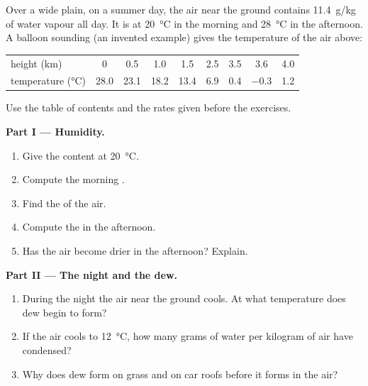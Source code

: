 \begin{problem}
\label{pb:g10:why-clouds-form:1}
Over a wide plain, on a summer day, the air near the ground contains
\qty{11.4}{g/kg} of water vapour all day. It is at \qty{20}{\degreeCelsius}
in the morning and \qty{28}{\degreeCelsius} in the afternoon. A balloon
sounding (an invented example) gives the temperature of the air above:

\begin{center}
\small
\begin{tabular}{l*{8}{c}}
\hline
height (km) & 0 & 0.5 & 1.0 & 1.5 & 2.5 & 3.5 & 3.6 & 4.0 \\
temperature (\unit{\degreeCelsius}) & 28.0 & 23.1 & 18.2 & 13.4 & 6.9 & 0.4 & $-0.3$ & 1.2 \\
\hline
\end{tabular}
\end{center}

\noindent Use the table of  contents and the rates given before
the exercises.

\medskip
\noindent\textbf{Part I --- Humidity.}
\begin{enumerate}
  \item Give the  content at \qty{20}{\degreeCelsius}.
  \item Compute the morning .
  \item Find the  of the air.
  \item Compute the  in the afternoon.
  \item Has the air become drier in the afternoon? Explain.
\end{enumerate}

\medskip
\noindent\textbf{Part II --- The night and the dew.}
\begin{enumerate}[resume]
  \item During the night the air near the ground cools. At what temperature
        does dew begin to form?
  \item If the air cools to \qty{12}{\degreeCelsius}, how many grams of
        water per kilogram of air have condensed?
  \item Why does dew form on grass and on car roofs before it forms in the
        air?
\end{enumerate}


\end{problem}
